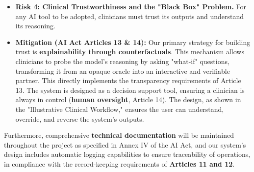 \documentclass[11pt, a4paper]{article}
\begin{document}
\begin{itemize}
    \item \textbf{Risk 4: Clinical Trustworthiness and the "Black Box" Problem.} For any AI tool to be adopted, clinicians must trust its outputs and understand its reasoning.
    \item \textbf{Mitigation (AI Act Articles 13 \& 14):} Our primary strategy for building trust is \textbf{explainability through counterfactuals}. This mechanism allows clinicians to probe the model's reasoning by asking "what-if" questions, transforming it from an opaque oracle into an interactive and verifiable partner. This directly implements the transparency requirements of Article 13. The system is designed as a decision support tool, ensuring a clinician is always in control (\textbf{human oversight}, Article 14). The design, as shown in the "Illustrative Clinical Workflow," ensures the user can understand, override, and reverse the system's outputs.
\end{itemize}
Furthermore, comprehensive \textbf{technical documentation} will be maintained throughout the project as specified in Annex IV of the AI Act, and our system's design includes automatic logging capabilities to ensure traceability of operations, in compliance with the record-keeping requirements of \textbf{Articles 11 and 12}.




\end{document}

